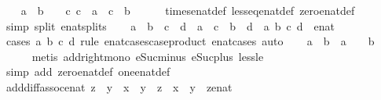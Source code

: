 \begin{isabellebody}
\ \ \isamarkupfalse%
\ {\isachardoublequoteopen}a\ {\isasymle}\ b\ {\isasymLongrightarrow}\ {}\ {\isasymle}\ c\ {\isasymLongrightarrow}c\ {\isacharasterisk}\ a\ {\isasymle}\ c\ {\isacharasterisk}\ b{\isachardoublequoteclose}\isanewline
\ \ \ \ \isamarkupfalse%
\ times{\isacharunderscore}enat{\isacharunderscore}def\ less{\isacharunderscore}eq{\isacharunderscore}enat{\isacharunderscore}def\ zero{\isacharunderscore}enat{\isacharunderscore}def\isanewline
\ \ \ \ \isamarkupfalse%
\ {\isacharparenleft}simp\ split{\isacharcolon}\ enat{\isachardot}splits{\isacharparenright}\isanewline
\ \ \isamarkupfalse%
\ {\isachardoublequoteopen}a\ {\isacharless}\ b\ {\isasymLongrightarrow}\ c\ {\isacharless}\ d\ {\isasymLongrightarrow}\ a\ {\isacharplus}\ c\ {\isacharless}\ b\ {\isacharplus}\ d{\isachardoublequoteclose}\ \ a\ b\ c\ d\ {\isacharcolon}{\isacharcolon}\ enat\isanewline
\ \ \ \ \isamarkupfalse%
\ {\isacharparenleft}cases\ a\ b\ c\ d\ rule{\isacharcolon}\ enat{}{\isacharunderscore}cases{\isacharbrackleft}case{\isacharunderscore}product\ enat{}{\isacharunderscore}cases{\isacharbrackright}{\isacharparenright}\ auto\isanewline
\ \ \isamarkupfalse%
\ {\isachardoublequoteopen}a\ {\isacharless}\ b\ {\isasymLongrightarrow}\ a\ {\isacharplus}\ {}\ {\isacharless}\ b\ {\isacharplus}\ {}{\isachardoublequoteclose}\isanewline
\ \ \ \ \isamarkupfalse%
\ {\isacharparenleft}metis\ add{\isacharunderscore}right{\isacharunderscore}mono\ eSuc{\isacharunderscore}minus{\isacharunderscore}{}\ eSuc{\isacharunderscore}plus{\isacharunderscore}{}\ less{\isacharunderscore}le{\isacharparenright}\isanewline
{}\isamarkupfalse%
\ {\isacharparenleft}simp\ add{\isacharcolon}\ zero{\isacharunderscore}enat{\isacharunderscore}def\ one{\isacharunderscore}enat{\isacharunderscore}def{\isacharparenright}%
\endisatagproof
{\isafoldproof}%
%
\isadelimproof
\isanewline
%
\endisadelimproof
\isanewline
\isanewline
\isanewline
{}\isamarkupfalse%
\ add{\isacharunderscore}diff{\isacharunderscore}assoc{\isacharunderscore}enat{\isacharcolon}\ {\isachardoublequoteopen}z\ {\isasymle}\ y\ {\isasymLongrightarrow}\ x\ {\isacharplus}\ {\isacharparenleft}y\ {\isacharminus}\ z{\isacharparenright}\ {\isacharequal}\ x\ {\isacharplus}\ y\ {\isacharminus}\ {\isacharparenleft}z{\isacharcolon}{\isacharcolon}enat{\isacharparenright}{\isachardoublequoteclose}\isanewline
%
\isadelimproof

\end{isabellebody}
